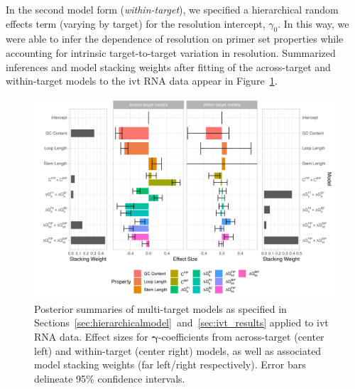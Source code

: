 \documentclass[../thesis.tex]{subfiles}
\begin{document}
In the second model form (\emph{within-target}), we specified a hierarchical random effects term (varying by target) for the resolution intercept, $\gamma_0$. In this way, we were able to infer the dependence of resolution on primer set properties while accounting for intrinsic target-to-target variation in resolution. Summarized inferences and model stacking weights after fitting of the across-target and within-target models to the \gls{ivt} RNA data appear in Figure~\ref{fig:ivt_eval}.

\begin{figure}[!tpb] 
\centering
\includegraphics[width=6in]{../figures/chapter2/paper_ivt_eval_fig.png}
\caption{Posterior summaries of multi-target models as specified in Sections~\ref{sec:hierarchicalmodel}~and~\ref{sec:ivt_results} applied to \gls{ivt} RNA data. Effect sizes for $\bm{\gamma}$-coefficients from across-target (center left) and within-target (center right) models, as well as associated model stacking weights (far left/right respectively). Error bars delineate 95\% confidence intervals. \label{fig:ivt_eval}}
\end{figure}
\end{document}
